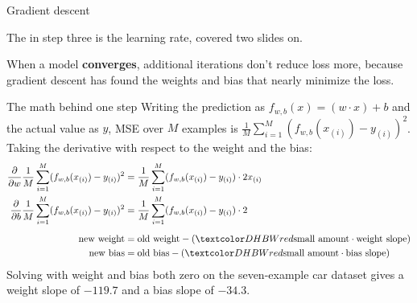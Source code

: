 \begin{frame}{Gradient descent}
  \begin{withmargin}
    \begin{tdmargin}
      The  in step three is the learning rate, covered two
      slides on.
      \par\medskip
      When a model \textbf{converges}, additional iterations don't reduce loss
      more, because gradient descent has found the weights and bias that nearly
      minimize the loss.
    \end{tdmargin}
  \end{withmargin}
\end{frame}

\begin{frame}{The math behind one step}
  \small
  Writing the prediction as $f_{w,b}(x) = (w \cdot x) + b$ and the actual value
  as $y$, MSE over $M$ examples is $\frac{1}{M}\sum_{i=1}^{M}(f_{w,b}(x_{(i)}) - y_{(i)})^2$.
  Taking the derivative with respect to the weight and the bias:
  \begin{align*}
    \frac{\partial}{\partial w}\frac{1}{M}\sum_{i=1}^{M}(f_{w,b}(x_{(i)}) - y_{(i)})^2
      &= \frac{1}{M}\sum_{i=1}^{M}(f_{w,b}(x_{(i)}) - y_{(i)}) \cdot 2x_{(i)}\\
    \frac{\partial}{\partial b}\frac{1}{M}\sum_{i=1}^{M}(f_{w,b}(x_{(i)}) - y_{(i)})^2
      &= \frac{1}{M}\sum_{i=1}^{M}(f_{w,b}(x_{(i)}) - y_{(i)}) \cdot 2\\[0.5em]
    \text{new weight} &= \text{old weight} - (\gterm{\text{small amount}} \cdot \text{weight slope})\\
    \text{new bias} &= \text{old bias} - (\gterm{\text{small amount}} \cdot \text{bias slope})
  \end{align*}
  \footnotesize
  Solving with weight and bias both zero on the seven-example car dataset gives
  a weight slope of $-119.7$ and a bias slope of $-34.3$.
\end{frame}

